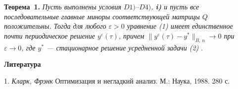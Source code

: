 \textbf{Теорема~1.} {\it Пусть выполнены условия  $D1)$--$D4)$, \textbf{i)} и пусть все последовательные главные миноры соответствующей матрицы $Q$ положительны. Тогда для любого $\varepsilon >0$ уравнение (1) имеет единственное почти периодическое решение $y^\varepsilon(\tau)$, причем ${\|y^\varepsilon(\tau)-y^*\|_{B,\, n}\rightarrow 0}$ при $\varepsilon\rightarrow 0$, где $y^*$ --- стационарное решение усредненной задачи (2)} .


\smallskip \centerline{\bf Литература}\nopagebreak

1. {\it Кларк, Фрэнк} Оптимизация и негладкий анализ. М.: Наука, 1988. 280 с.

